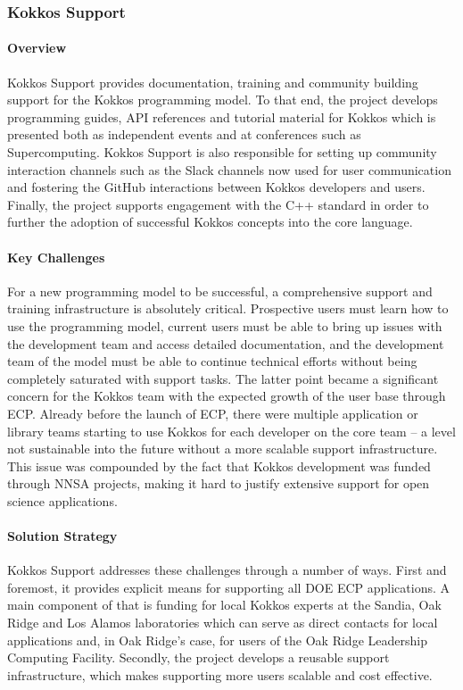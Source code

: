 \subsubsection{ Kokkos Support} 

\paragraph{Overview} 
Kokkos Support provides documentation, training and community building support for the Kokkos programming model. 
To that end, the project develops programming guides, API references and tutorial material for Kokkos which is presented both as independent events and at conferences such as Supercomputing.
Kokkos Support is also responsible for setting up community interaction channels such as the Slack channels now used for user communication and fostering the GitHub interactions between Kokkos developers and users.
Finally, the project supports engagement with the C++ standard in order to further the adoption of successful Kokkos concepts into the core language. 

\paragraph{Key Challenges}
For a new programming model to be successful, a comprehensive support and training infrastructure is absolutely critical. 
Prospective users must learn how to use the programming model, current users must be able to bring up issues with the development team and access detailed documentation, and the development team of the model must be able to continue technical efforts without being completely saturated with support tasks. 
The latter point became a significant concern for the Kokkos team with the expected growth of the user base through ECP.  
Already before the launch of ECP, there were multiple application or library teams starting to use Kokkos for each developer on the core team -- a level not sustainable into the future without a more scalable support infrastructure. 
This issue was compounded by the fact that Kokkos development was funded through NNSA projects, making it hard to justify extensive support for open science applications. 

\paragraph{Solution Strategy}

Kokkos Support addresses these challenges through a number of ways. 
First and foremost, it provides explicit means for supporting all DOE ECP applications. 
A main component of that is funding for local Kokkos experts at the Sandia, Oak Ridge and Los Alamos laboratories which can serve as direct contacts for local applications and, in Oak Ridge's case, for users of the Oak Ridge Leadership Computing Facility. 
Secondly, the project develops a reusable support infrastructure, which makes supporting more users scalable and cost effective. 

